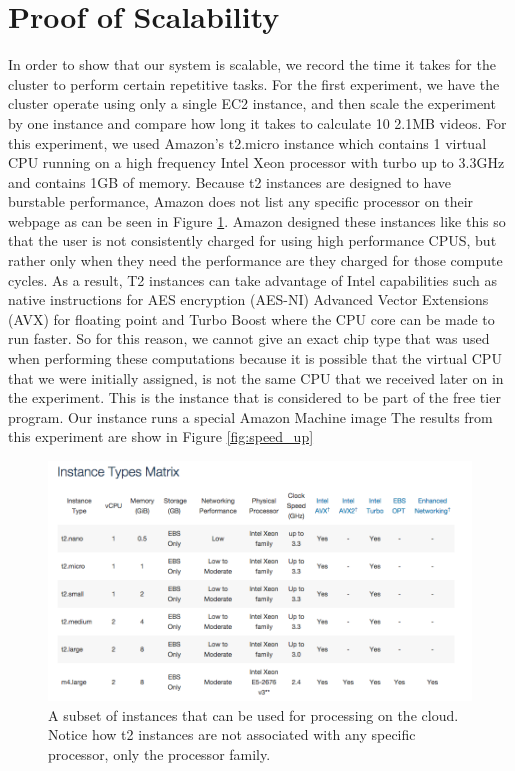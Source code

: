 \section{\label{section:scalability}Proof of Scalability}
In order to show that our system is scalable, we record the time it takes for
the cluster to perform certain repetitive tasks. For the first experiment, we
have the cluster operate using only a single EC2 instance, and then scale the
experiment by one instance and compare how long it takes to calculate 10 2.1MB
videos. For this experiment, we used Amazon's t2.micro instance which contains 1
virtual CPU running on a high frequency Intel Xeon processor with turbo up to
3.3GHz and contains 1GB of memory. Because t2 instances are designed to  have
burstable performance, Amazon does not list any specific processor on their webpage
as can be seen in Figure \ref{fig:instance_table}. Amazon designed
these instances like this so that the user is not consistently charged  for using
high performance CPUS, but rather only when they need the performance are  they
charged for those compute cycles. As a result, T2 instances can take
advantage of Intel capabilities such as native instructions for AES
encryption (AES-NI) Advanced Vector Extensions (AVX) for floating point and
Turbo Boost where the CPU core can be made to run faster. So for this reason, we
cannot give an exact chip type that was used when performing these computations
because it is possible that the virtual CPU that we were initially assigned, is
not the same CPU that we received later on in the experiment. This is the
instance that is considered to be part of the free tier program. Our instance
runs a special Amazon Machine image The results from this experiment are show in
Figure
\ref{fig:speed_up}

\begin{figure}[h]
  \label{fig:instance_table}
  \centering
  \includegraphics[width=\textwidth]{figures/instance_table}
  \caption{A subset of instances that can be used for processing on the cloud.
  Notice how t2 instances are not associated with any specific processor, only
  the processor family.}
\end{figure}

